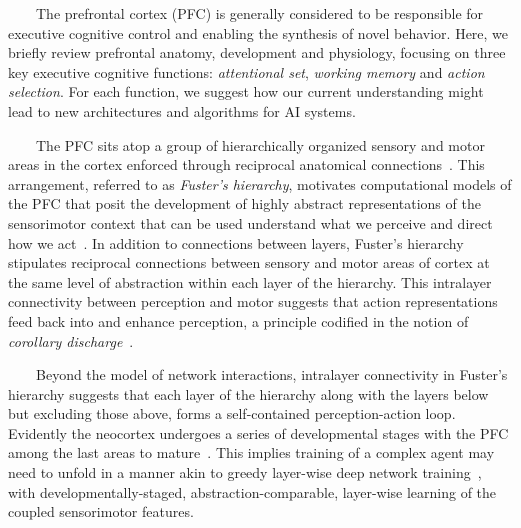 
\begin{center}
  \begin{tcolorbox}[breakable,sharp corners=all,coltitle=black,colbacktitle=white,
    width=\textwidth,boxsep=5pt,left=5pt,right=5pt,
    title={\textbf{Box C: Hierarchy, Abstraction and Executive Control}}]

    
~~~~The prefrontal cortex (PFC) is generally considered to be responsible for executive cognitive control and enabling the synthesis of novel behavior. Here, we briefly review prefrontal anatomy, development and physiology, focusing on three key executive cognitive functions: {\it{attentional set}}, {\it{working memory}} and {\it{action selection}}. For each function, we suggest how our current understanding might lead to new architectures and algorithms for AI systems.

~~~~The PFC sits atop a group of hierarchically organized sensory and motor areas in the cortex enforced through reciprocal anatomical connections~\cite{FusterPREFRONTAL-CORTEX-15}. This arrangement, referred to as {\it{Fuster’s hierarchy}}, motivates computational models of the PFC that posit the development of highly abstract representations of the sensorimotor context that can be used understand what we perceive and direct how we act~\cite{BotvinickPTRS_B-07}. In addition to connections between layers, Fuster’s hierarchy stipulates reciprocal connections between sensory and motor areas of cortex at the same level of abstraction within each layer of the hierarchy. This intralayer connectivity between perception and motor suggests that action representations feed back into and enhance perception, a principle codified in the notion of {\it{corollary discharge}}~\cite{mccloskey2011corollary}.

~~~~Beyond the model of network interactions, intralayer connectivity in Fuster's hierarchy suggests that each layer of the hierarchy along with the layers below but excluding those above, forms a self-contained perception-action loop. Evidently the neocortex undergoes a series of developmental stages with the PFC among the last areas to mature~\cite{guillery2005postnatal}. This implies training of a complex agent may need to unfold in a manner akin to greedy layer-wise deep network training~\cite{BengioetalNIPS-07,belilovsky2018greedy}, with developmentally-staged, abstraction-comparable, layer-wise learning of the coupled sensorimotor features.


\end{tcolorbox}
\end{center}
